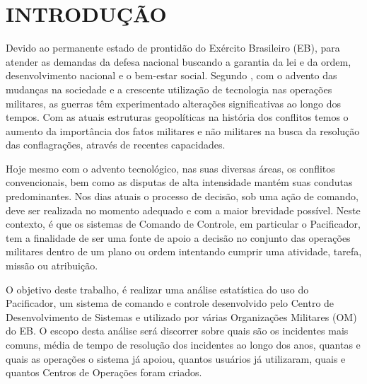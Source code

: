 % 
%


\chapter{INTRODUÇÃO}
Devido ao permanente estado de prontidão do Exército Brasileiro (EB), para atender as demandas da defesa nacional buscando a garantia da lei e da ordem, desenvolvimento nacional e o bem-estar social. Segundo \cite{operacao2017}, com o advento das mudanças na sociedade e a crescente utilização de  tecnologia nas operações militares, as guerras têm experimentado alterações significativas ao longo dos tempos. Com as atuais estruturas geopolíticas na história dos conflitos temos o aumento da importância dos fatos militares e não militares na busca da resolução das conflagrações, através de recentes capacidades.

Hoje mesmo com o advento tecnológico, nas suas diversas áreas, os conflitos convencionais, bem como as disputas de alta intensidade mantém suas condutas predominantes. Nos dias atuais o processo de decisão, sob uma ação de comando, deve ser realizada no momento adequado e com a maior brevidade possível. Neste contexto, é que os sistemas de Comando de Controle, em particular o Pacificador, tem a finalidade de ser uma fonte de apoio a decisão no conjunto das operações militares dentro de um plano ou ordem intentando cumprir uma atividade, tarefa, missão ou atribuição. 

O objetivo deste trabalho, é realizar uma análise estatística do uso do Pacificador, um sistema de comando e controle desenvolvido pelo Centro de Desenvolvimento de Sistemas e utilizado por várias Organizações Militares (OM) do EB. O escopo desta análise será discorrer sobre quais são os incidentes mais comuns, média de tempo de resolução dos incidentes ao longo dos anos, quantas e quais as operações o sistema já apoiou, quantos usuários já utilizaram, quais e quantos Centros de Operações foram criados.

